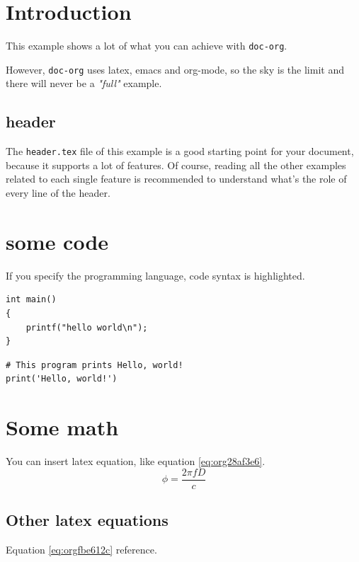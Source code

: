 


\maketitle
\thispagestyle{empty}
\newpage

\tableofcontents
\newpage

\pagestyle{plain}

\section{Introduction}
\label{sec:org987945e}
This example shows a lot of what you can achieve with \texttt{doc-org}.

However, \texttt{doc-org} uses latex, emacs and org-mode, so the sky is the limit and
there will never be a \emph{"full"} example.

\subsection{header}
\label{sec:orga3b6c3a}
The \texttt{header.tex} file of this example is a good starting point for your
document, because it supports a lot of features.
Of course, reading all the other examples related to each single feature is
recommended to understand what's the role of every line of the header.
\section{some code}
\label{sec:org6561320}
If you specify the programming language, code syntax is highlighted.
\begin{verbatim}
int main()
{
    printf("hello world\n");
}
\end{verbatim}

\begin{verbatim}
# This program prints Hello, world!
print('Hello, world!')
\end{verbatim}

\section{Some math}
\label{sec:org82b19af}
You can insert latex equation, like equation \ref{eq:org28af3e6}.
\begin{equation}
\label{eq:org28af3e6}
\phi = \frac{2\pi fD}{c}
\end{equation}
\subsection{Other latex equations}
\label{sec:org78095f0}
Equation \ref{eq:orgfbe612c} reference.


